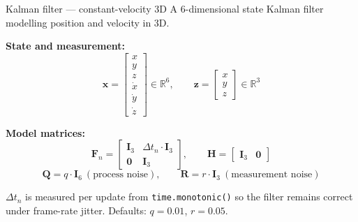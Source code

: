 \documentclass[10pt,aspectratio=169]{beamer}
\begin{document}
\begin{frame}{Kalman filter --- constant-velocity 3D}
A 6-dimensional state Kalman filter modelling position and velocity in 3D.

\textbf{State and measurement:}
\[
\mathbf{x} = \begin{bmatrix} x \\ y \\ z \\ \dot{x} \\ \dot{y} \\ \dot{z} \end{bmatrix} \in \mathbb{R}^6,
\qquad
\mathbf{z} = \begin{bmatrix} x \\ y \\ z \end{bmatrix} \in \mathbb{R}^3
\]

\textbf{Model matrices:}
\[
\mathbf{F}_n = \begin{bmatrix} \mathbf{I}_3 & \Delta t_n \cdot \mathbf{I}_3 \\ \mathbf{0} & \mathbf{I}_3 \end{bmatrix},
\qquad
\mathbf{H} = \begin{bmatrix} \mathbf{I}_3 & \mathbf{0} \end{bmatrix}
\]
\[
\mathbf{Q} = q \cdot \mathbf{I}_6 \ (\text{process noise}),
\qquad
\mathbf{R} = r \cdot \mathbf{I}_3 \ (\text{measurement noise})
\]

$\Delta t_n$ is measured per update from \texttt{time.monotonic()} so the filter remains correct under frame-rate jitter. Defaults: $q = 0.01$, $r = 0.05$.
\end{frame}
\end{document}
